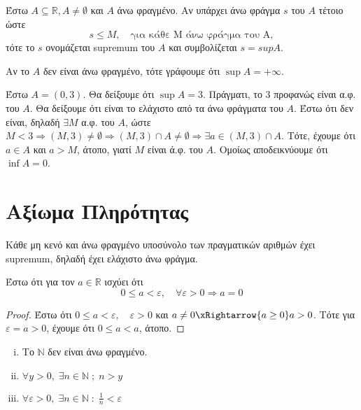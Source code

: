 \documentclass[main.tex]{subfiles}
\begin{document}
 \begin{dfn}
     Έστω $ A \subseteq \mathbb{R}, A \neq \emptyset $ και $A$ άνω 
     φραγμένο. Αν υπάρχει άνω φράγμα $s$ του $A$ τέτοιο ώστε 
\[
    s \leq M, \quad \text{για κάθε M άνω φράγμα του A}, 
 \] 
 τότε το $s$ ονομάζεται supremum του $A$ και συμβολίζεται $ s=sup A $.
 \end{dfn}

 \begin{rem}
     Αν το $A$ δεν είναι άνω φραγμένο, τότε γράφουμε ότι $ \sup A = + \infty $.
 \end{rem}

 \begin{example}
     Έστω $ A = (0,3) $. Θα δείξουμε ότι $ \sup A = 3 $. Πράγματι, 
     το $ 3 $ προφανώς είναι α.φ. του $A$. Θα δείξουμε ότι είναι το
     ελάχιστο από τα άνω φράγματα του $A$. Έστω ότι δεν είναι, δηλαδή 
     $ \exists M $ α.φ. του $A$, ώστε $ M < 3 \Rightarrow (M,3) \neq 
     \emptyset \Rightarrow (M,3) \cap A \neq \emptyset \Rightarrow \exists 
     a \in (M,3) \cap A $. Τότε, έχουμε ότι $ a \in A $ και $ a > M $, 
     άτοπο, γιατί $M$ είναι ά.φ. του $A$. Ομοίως αποδεικνύουμε ότι $ 
     \inf A = 0$.
 \end{example}

 \section{Αξίωμα Πληρότητας}

 Κάθε μη κενό και άνω φραγμένο υποσύνολο των πραγματικών αριθμών έχει 
 supremum, δηλαδή έχει ελάχιστο άνω φράγμα.

 \begin{prop}
     Έστω ότι για τον $a \in \mathbb{R}$ ισχύει ότι 
     \[
        0 \leq a < \varepsilon, \quad \forall \varepsilon >0 \Rightarrow a =0 
      \] 
 \end{prop}

      \begin{proof}
      \item {}
         Έστω ότι $ 0 \leq a < \varepsilon, \quad \varepsilon >0 $ και 
         $ a \neq 0 \xRightarrow{a \geq 0} a > 0$. Τότε για $ \varepsilon = 
         a > 0$, έχουμε ότι $ 0 \leq a < a $, άτοπο.
      \end{proof}

      \begin{prop}
      \item {}
          \begin{enumerate}[i)]
              \item Το $ \mathbb{N} $ δεν είναι άνω φραγμένο.
              \item $ \forall y > 0, \; \exists n \in \mathbb{N} \; ; \; 
                  n > y$
              \item $ \forall \varepsilon >0, \; \exists n \in \mathbb{N} \; 
                  : \; \frac{1}{n} < \varepsilon$
          \end{enumerate}
      \end{prop}
\end{document}
